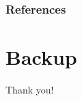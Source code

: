 \documentclass[usenames,dvipsnames]{beamer}
\theoremstyle{definition}
\begin{document}
\begin{frame}[allowframebreaks]
    \frametitle{References}
    

    
\end{frame}

\section{Backup}
\begin{frame}{}
\begin{center}
    \Large{Thank you!}
\end{center}
        
\end{frame}


\end{document}
